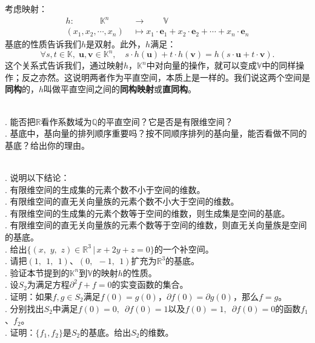 \documentclass[12pt,UTF8]{ctexbook}
\begin{document}
考虑映射：
\begin{align*}
    h:\quad \qquad \mathbb{K}^n\qquad &\rightarrow \qquad \mathbb{V} \\
    (x_1, x_2, \cdots , x_n) &\mapsto x_1\cdot \mathbf{e}_1 + x_2\cdot \mathbf{e}_2 + \cdots + x_n\cdot \mathbf{e}_n
\end{align*}
基底的性质告诉我们$h$是双射。此外，$h$满足：
$$ \forall s, t \in \mathbb{K}, \; \mathbf{u}, \mathbf{v}\in \mathbb{K}^n, \quad s\cdot h(\mathbf{u}) + t\cdot h(\mathbf{v}) = h(s\cdot \mathbf{u} + t\cdot \mathbf{v}). $$
这个关系式告诉我们，通过映射$h$，$\mathbb{K}^n$中对向量的操作，就可以变成$\mathbb{V}$中的同样操作；反之亦然。这说明两者作为平直空间，本质上是一样的。我们说这两个空间是\textbf{同构}的，$h$叫做平直空间之间的\textbf{同构映射}或\textbf{直同构}。

\begin{sk}
    \mbox{} \\
    . 能否把$\mathbb{R}$看作系数域为$\mathbb{Q}$的平直空间？它是否是有限维空间？\\
    . 基底中，基向量的排列顺序重要吗？按不同顺序排列的基向量，能否看做不同的基底？给出你的理由。
\end{sk}

\begin{xt}
    \mbox{} \\
    . 说明以下结论：\\
    . 有限维空间的生成集的元素个数不小于空间的维数。\\
    . 有限维空间的直无关向量族的元素个数不小大于空间的维数。\\
    . 有限维空间的生成集的元素个数等于空间的维数，则生成集是空间的基底。\\
    . 有限维空间的直无关向量族的元素个数等于空间的维数，则直无关向量族是空间的基底。\\
    . 给出$\{(x,\,\,y,\,\,z)\in\mathbb{R}^3 \, | \, x + 2y + z = 0 \}$的一个补空间。\\
    . 请把$(1,\;\,1, \;\,1)$、$(0,\;\, -1, \;\,1)$扩充为$\mathbb{R}^3$的基底。\\
    . 验证本节提到的$\mathbb{K}^n$到$\mathbb{V}$的映射$h$的性质。\\
    . 设$S_2$为满足方程$\partial^2 f + f = 0$的实变函数的集合。\\
    . 证明：如果$f,g\in S_2$满足$f(0) = g(0)$，$\partial f(0) = \partial g(0)$，那么$f = g$。\\
    . 分别找出$S_2$中满足$f(0) = 0, \,\,\, \partial f(0) = 1$以及$f(0) = 1, \,\,\, \partial f(0) = 0$的函数$f_1$、$f_2$。\\
    . 证明：$\{f_1, f_2\}$是$S_2$的基底。给出$S_2$的维数。
\end{xt}
\end{document}
